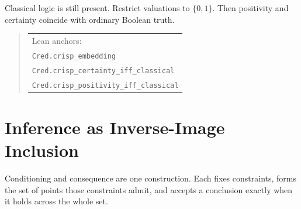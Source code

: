 \documentclass[11pt,a4paper]{article}
\newcommand{\Lean}[1]{\texttt{#1}}
\begin{document}
Classical logic is still present.  Restrict valuations to $\{0,1\}$.
Then positivity and certainty coincide with ordinary Boolean truth.
\begin{quote}\scriptsize
\begin{tabular}{@{}l@{}}
Lean anchors: \\
\Lean{Cred.crisp\_embedding}\\
\Lean{Cred.crisp\_certainty\_iff\_classical}\\
\Lean{Cred.crisp\_positivity\_iff\_classical}
\end{tabular}
\end{quote}

\section{Inference as Inverse-Image Inclusion}
\label{sec:inference-principle}

Conditioning and consequence are one construction.  Each fixes
constraints, forms the set of points those constraints admit, and
accepts a conclusion exactly when it holds across the whole set.
\end{document}
